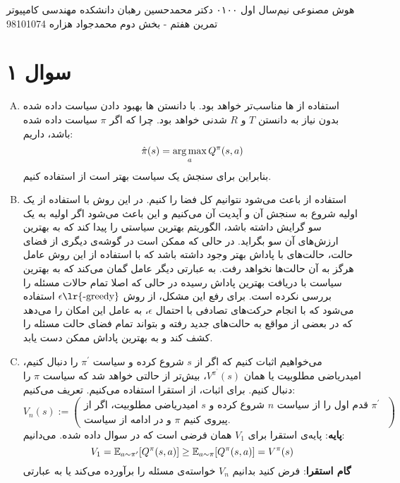 \documentclass[a4paper, 12pt]{article}
\begin{document}
\handout
{هوش مصنوعی}
{نیم‌سال اول ۰۱\lr{-}۰۰}
{دکتر محمدحسین رهبان}
{دانشکده مهندسی کامپیوتر}
{تمرین هفتم - بخش دوم}
{محمدجواد هزاره}
{98101074}
\noindent
\\[-6.5em]
\section{سوال ۱}
\begin{enumerate}[A)]
	\item
	استفاده از 
	ها
	مناسب‌تر خواهد بود. با دانستن 
	ها
	بهبود دادن سیاست داده شده بدون نیاز به دانستن 
	$T$
	و
	$R$
	شدنی‌ خواهد بود. چرا که اگر $\pi$ سیاست داده شده باشد، داریم:
	\[
	\hat{\pi}(s) = \operatorname*{arg\,max}_a Q^{\pi}(s, a)
	\]
	بنابراین برای سنجش یک سیاست بهتر است از
	استفاده کنیم.
	\item
	استفاده از  باعث می‌شود نتوانیم کل فضا را  کنیم. در این روش با استفاده از یک  اولیه شروع به سنجش آن و آپدیت آن می‌کنیم و این باعث می‌شود اگر  اولیه به یک سو گرایش داشته باشد، الگوریتم بهترین سیاستی را پیدا کند که به بهترین ارزش‌های آن سو بگراید. در حالی که ممکن است در گوشه‌ی دیگری از فضای حالت، حالت‌های با پاداش بهتر وجود داشته باشد که با استفاده از این روش عامل هرگز به آن حالت‌ها نخواهد رفت. به عبارتی دیگر عامل گمان می‌کند که به بهترین سیاست با دریافت بهترین پاداش رسیده در حالی که اصلا تمام حالات مسئله را بررسی نکرده است. برای رفع این مشکل، از روش
	$\epsilon\text{\lr{-greedy}}$
	استفاده می‌شود که با انجام حرکت‌های تصادفی با احتمال $\epsilon$، به عامل این امکان را می‌دهد که در بعضی از مواقع به حالت‌های جدید رفته و بتواند تمام فضای حالت مسئله را کشف کند و به بهترین پاداش ممکن دست یابد.
	\item
	می‌خواهیم اثبات کنیم که اگر از $s$ شروع کرده و سیاست $\pi^\prime$ را دنبال کنیم، امیدریاضی مطلوبیت یا همان
	$V^{\pi^\prime}(s)$،
	 بیش‌تر از حالتی خواهد شد که سیاست $\pi$ را دنبال کنیم. برای اثبات، از استقرا استفاده می‌کنیم. تعریف می‌کنیم:
	\[
	V_n(s):=
	\left(\begin{gathered}
		\text{
		امیدریاضی مطلوبیت، اگر از $s$ شروع کرده و $n$ قدم اول را از سیاست $\pi^\prime$
		} \\
		\text{
		و در ادامه از سیاست $\pi$ پیروی کنیم.
		}
	\end{gathered}\right)
	\]
	\textbf{پایه}:
	پایه‌ی استقرا برای $V_1$ همان فرضی است که در سوال داده شده. می‌دانیم:
	\[
	V_1 = {\mathbb E}_{a\sim \pi^\prime}[Q^\pi(s, a)] \ge {\mathbb E}_{a\sim \pi}[Q^\pi(s,a)] = V^\pi(s)
	\]
	\textbf{گام استقرا}:
	فرض کنید بدانیم $V_n$ خواسته‌ی مسئله را برآورده می‌کند یا به عبارتی

\end{enumerate}
\end{document}
